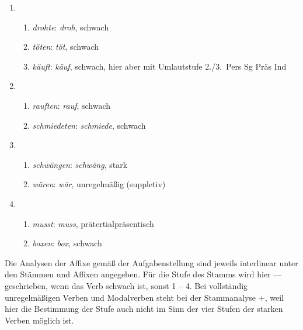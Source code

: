 \begin{enumerate}
  \item
    \begin{enumerate}
      \item \textit{drohte}: \textit{droh}, schwach
      \item \textit{töten}: \textit{töt}, schwach
      \item \textit{käuft}: \textit{käuf}, schwach, hier aber mit Umlautstufe 2.\slash 3.~Pers Sg Präs Ind
    \end{enumerate}
  \item
    \begin{enumerate}
      \item \textit{rauften}: \textit{rauf}, schwach
      \item \textit{schmiedeten}: \textit{schmiede}, schwach
    \end{enumerate}
  \item
    \begin{enumerate}
      \item \textit{schwängen}: \textit{schwäng}, stark
      \item \textit{wären}: \textit{wär}, unregelmäßig (suppletiv)
    \end{enumerate}
  \item
    \begin{enumerate}
      \item \textit{musst}: \textit{muss}, prätertialpräsentisch
      \item \textit{boxen}: \textit{box}, schwach
    \end{enumerate}
\end{enumerate}

\Stretch

\label{sol:verbalflexion05}

Die Analysen der Affixe gemäß der Aufgabenstellung sind jeweils interlinear unter den Stämmen und Affixen angegeben.
Für die Stufe des Stamms wird hier --- geschrieben, wenn das Verb schwach ist, sonst 1 -- 4.
Bei vollständig unregelmäßigen Verben und Modalverben steht bei der Stammanalyse $+$, weil hier die Bestimmung der Stufe auch nicht im Sinn der vier Stufen der starken Verben möglich ist.

\Np

\setcounter{equation}{0}

